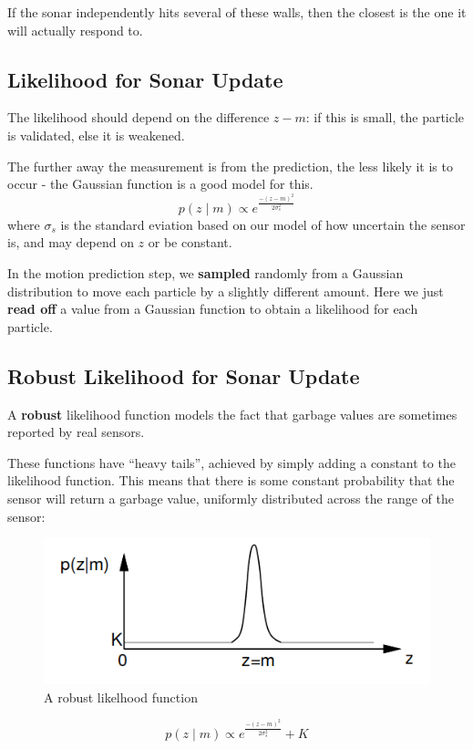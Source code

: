 \documentclass[11pt]{article}
\begin{document}
If the sonar independently hits several of these walls, then the closest is the one it will actually respond to.

\subsection{Likelihood for Sonar Update}
The likelihood should depend on the difference $z - m$: if this is small, the particle is validated, else it is weakened.

The further away the measurement is from the prediction, the less likely it is to occur - the Gaussian function is a good model for this.
\[
  p(z \mid m) \propto e^{\frac{-(z - m)^2}{2 \sigma^2_s}}
\]
where $\sigma_s$ is the standard eviation based on our model of how uncertain the sensor is, and may depend on $z$ or be constant.

In the motion prediction step, we \textbf{sampled} randomly from a Gaussian distribution to move each particle by a slightly different amount.
Here we just \textbf{read off} a value from a Gaussian function to obtain a likelihood for each particle.

\subsection{Robust Likelihood for Sonar Update}
A \textbf{robust} likelihood function models the fact that garbage values are sometimes reported by real sensors.

These functions have ``heavy tails'', achieved by simply adding a constant to the likelihood function.
This means that there is some constant probability that the sensor will return a garbage value, uniformly distributed across the range of the sensor:

\begin{figure}[h]
  \caption{A robust likelhood function}
  \includegraphics[scale=0.4]{robust}
  \centering
\end{figure}

\[
  p(z \mid m) \propto e^{\frac{-(z - m)^2}{2 \sigma^2_s}} + K
\]
\end{document}
